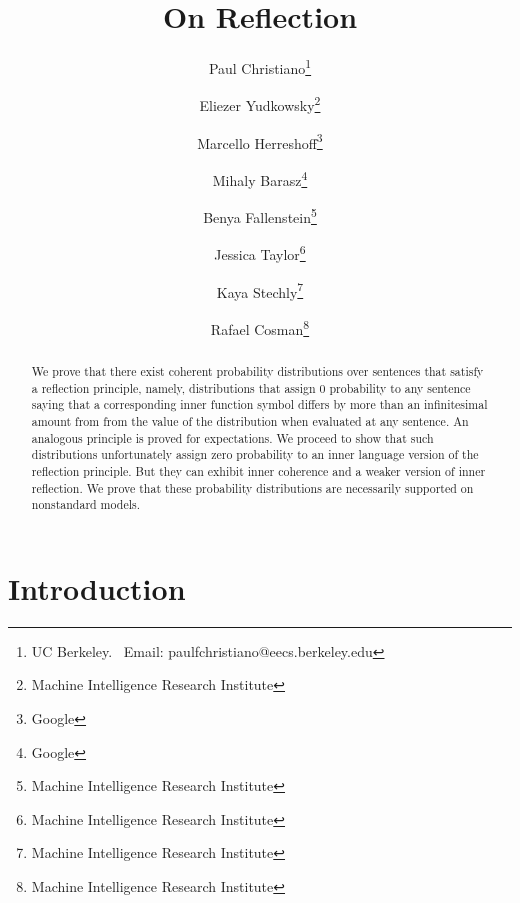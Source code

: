 \documentclass[12pt]{article}
\theoremstyle{plain}
\theoremstyle{definition}
\theoremstyle{remark}
\begin{document}
\title{On Reflection \\ }
\author{
Paul Christiano\thanks{UC Berkeley. \ Email: paulfchristiano@eecs.berkeley.edu}
\and
Eliezer Yudkowsky\thanks{Machine Intelligence Research Institute}
\and
Marcello Herreshoff\thanks{Google}
\and
Mihaly Barasz\thanks{Google}
\and 
Benya Fallenstein\thanks{Machine Intelligence Research Institute}
\and
Jessica Taylor\thanks{Machine Intelligence Research Institute}
\and 
Kaya Stechly\thanks{Machine Intelligence Research Institute}
\and
Rafael Cosman\thanks{Machine Intelligence Research Institute}
}
\maketitle
\begin{abstract}
We prove that there exist coherent probability distributions over sentences that satisfy a reflection principle, namely, distributions that assign 0 probability to any sentence saying that a corresponding inner function symbol differs by more than an infinitesimal amount from from the value of the distribution when evaluated at any sentence. An analogous principle is proved for expectations. We proceed to show that such distributions unfortunately assign zero probability to an inner language version of the reflection principle. But they can exhibit inner coherence and a weaker version of inner reflection. We prove that these probability distributions are necessarily supported on nonstandard models.
\end{abstract}
\setcounter{section}{-1}
\section{Introduction}





\end{document}
